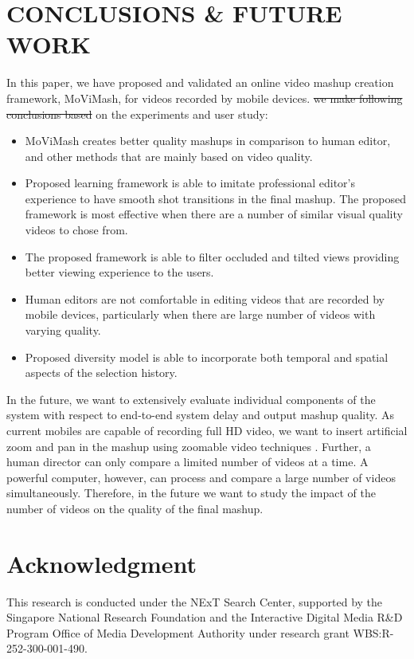 \documentclass{sig-alternate}
\providecommand{\DIFaddtex}[1]{{\protect\color{blue}\uwave{#1}}} %
\providecommand{\DIFdeltex}[1]{{\protect\color{red}\sout{#1}}}                      %
\providecommand{\DIFaddbegin}{} %
\providecommand{\DIFaddend}{} %
\providecommand{\DIFdelbegin}{} %
\providecommand{\DIFdelend}{} %
\providecommand{\DIFadd}[1]{\texorpdfstring{\DIFaddtex{#1}}{#1}} %
\providecommand{\DIFdel}[1]{\texorpdfstring{\DIFdeltex{#1}}{}} %
\begin{document}
    \section{CONCLUSIONS \& FUTURE WORK}
    In this paper, we have proposed and validated an online video mashup creation framework, MoViMash, for videos recorded by mobile devices. \DIFdelbegin \DIFdel{we make following conclusions based }\DIFdelend \DIFaddbegin \DIFadd{Based }\DIFaddend on the experiments and user study\DIFaddbegin \DIFadd{, we make following conclusions}\DIFaddend :
    \begin{itemize}
        \item MoViMash creates better quality mashups in comparison to human editor, and other methods that are mainly based on video quality.
        \item Proposed learning framework is able to imitate professional editor’s experience to have smooth shot transitions in the final mashup. The proposed framework is most effective when there are a number of similar visual quality videos to chose from.
        \item The proposed framework is able to filter occluded and tilted views providing better viewing experience to the users.
        \item Human editors are not comfortable in editing videos that are recorded by mobile devices, particularly when there are large number of videos with varying quality.
        \item Proposed diversity model is able to incorporate both temporal and spatial aspects of the selection history.
    \end{itemize}
    In the future, we want to extensively evaluate individual components of the system with respect to end-to-end system delay and output mashup quality. As current mobiles are capable of recording full HD video, we want to insert artificial zoom and pan in the mashup using zoomable video techniques \cite{11}. Further, a human director can only compare a limited number of videos at a time. A powerful computer, however, can process and compare a large number of videos simultaneously. Therefore, in the future we want to study the impact of the number of videos on the quality of the final mashup.

    \section*{Acknowledgment}
    This research is conducted under the NExT Search Center, supported by the Singapore National Research Foundation and the Interactive Digital Media R\&D Program Office of Media Development Authority under research grant WBS:R-252-300-001-490.

    
     
\end{document}
